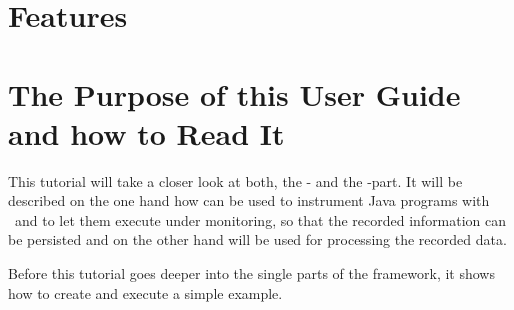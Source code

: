 \section{Features}


\section{The Purpose of this User Guide and how to Read It}

This tutorial will take a closer look at both, the \KiekerMonitoringPart{}- and %
the \KiekerAnalysisPart-part. It will be described on the one hand how %
\KiekerMonitoringPart{}  can be used to instrument Java programs %
with \Kieker\ and to let them execute under monitoring, so that the recorded %
information can be persisted and on the other hand \KiekerAnalysisPart{} %
will be used for processing the recorded data.

Before this tutorial goes deeper into the single parts of the framework, it %
shows how to create and execute a simple example.


